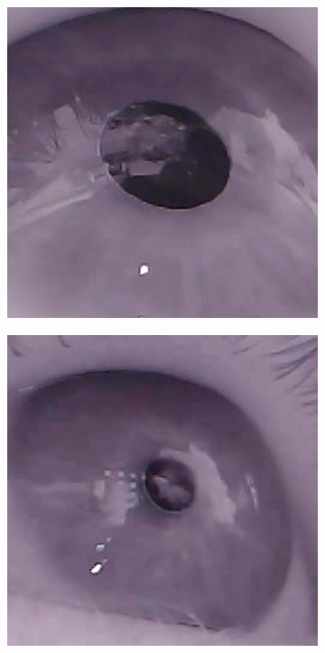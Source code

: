 \begin{figure}[h]
    \centering
    \begin{subfigure}{0.4\textwidth}
        \centering
        \includegraphics[width=0.9\linewidth]{plots/acwe/robusfit.png} 
    \end{subfigure}
    \begin{subfigure}{0.4\textwidth}
        \centering
        \includegraphics[width=0.9\linewidth]{plots/acwe/robusfit2.png} 

\end{subfigure}
\end{figure}
